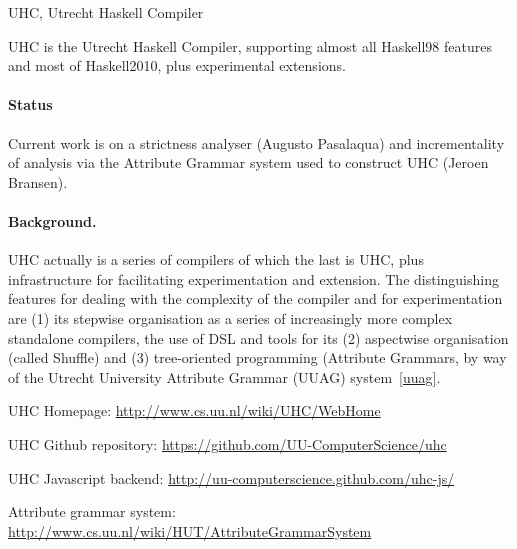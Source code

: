 \begin{hcarentry}[section]{UHC, Utrecht Haskell Compiler}
\label{uhc}
\label{ehc}
\makeheader

UHC is the Utrecht Haskell Compiler, supporting almost all Haskell98 features and most of Haskell2010, plus
experimental extensions.

\paragraph{Status}

Current work is on a strictness analyser (Augusto Pasalaqua) and
incrementality of analysis via the Attribute Grammar system used to construct UHC (Jeroen Bransen).

\paragraph{Background.}

UHC actually is a series of compilers of which the last is UHC, plus
infrastructure for facilitating experimentation and extension.
The distinguishing features for dealing with the complexity of the compiler and for experimentation are
(1) its stepwise organisation as a series of increasingly more complex standalone compilers,
the use of DSL and tools for its (2) aspectwise organisation (called Shuffle) and
(3) tree-oriented programming (Attribute Grammars, by way of the
Utrecht University Attribute Grammar (UUAG) system~\cref{uuag}.

\FurtherReading
\begin{compactitem}
\item UHC Homepage:
\url{http://www.cs.uu.nl/wiki/UHC/WebHome}

\item UHC Github repository:
\url{https://github.com/UU-ComputerScience/uhc}

\item UHC Javascript backend:
\url{http://uu-computerscience.github.com/uhc-js/}

\item Attribute grammar system:
\url{http://www.cs.uu.nl/wiki/HUT/AttributeGrammarSystem}

\end{compactitem}
\end{hcarentry}
